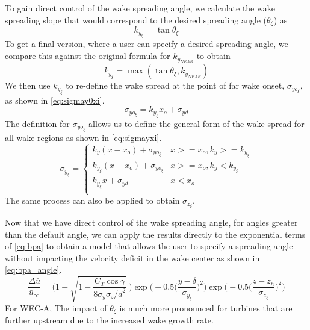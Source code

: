 \documentclass[a4paper]{jpconf}
\begin{document}
To gain direct control of the wake spreading angle, we calculate the wake spreading slope that would correspond to the desired spreading angle ($\theta_\xi$) as
%
\begin{equation}
k_{y_{\xi}} = \tan{\theta_\xi}
\end{equation}
%
To get a final version, where a user can specify a desired spreading angle, we compare this against the original formula for $k_{y_{NEAR}}$ to obtain
%
\begin{equation}
k_{y_{\xi}} = \max(\tan{\theta_\xi}, k_{y_{NEAR}})
\end{equation}
%
We then use $k_{y_{\xi}}$ to re-define the wake spread at the point of far wake onset, $\sigma_{yo_{\xi}}$, as shown in \cref{eq:sigmay0xi}.
%
\begin{equation}\label{eq:sigmay0xi}
\sigma_{yo_{\xi}} = k_{y_{\xi}}x_o+\sigma_{yd}
\end{equation}
%
The definition for $\sigma_{yo_{\xi}}$ allows us to define the general form of the wake spread for all wake regions as shown in \cref{eq:sigmayxi}. 
%
\begin{equation}\label{eq:sigmayxi}
\sigma_{y_{\xi}} =
\begin{cases} k_y (x-x_o)+\sigma_{yo_{\xi}} & x >= x_o, k_y >= k_{y_{\xi}} \\
k_{y_{\xi}} (x-x_o)+\sigma_{yo_{\xi}} & x >= x_o, k_y < k_{y_{\xi}} \\
k_{y_{\xi}}x+\sigma_{yd} & x < x_o \\
\end{cases}
\end{equation}
%
The same process can also be applied to obtain $\sigma_{z_{\xi}}$. 

Now that we have direct control of the wake spreading angle, for angles greater than the default angle, we can apply the results directly to the exponential terms of \cref{eq:bpa} to obtain  a model that allows the user to specify a spreading angle without impacting the velocity deficit in the wake center as shown in \cref{eq:bpa_angle}.
\begin{equation}
\frac{\Delta \bar{u}}{\bar{u}_{\infty}} = \Bigg(1-\sqrt{1-\frac{C_T \cos{\gamma}}{8 \sigma_y \sigma_z/d^2}}~\Bigg) \exp{\bigg(-0.5\Big(\frac{y-\delta}{\sigma_{y_{\xi}}}\Big)^2\bigg)}\exp{\bigg(-0.5\Big(\frac{z-z_h}{\sigma_{z_{\xi}}}\Big)^2\bigg)}
\label{eq:bpa_angle}
\end{equation}
%
For WEC-A, The impact of $\theta_\xi$ is much more pronounced for turbines that are further upstream due to the increased wake growth rate. 
\end{document}
